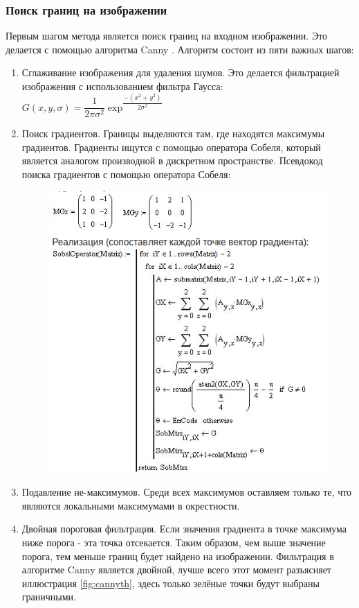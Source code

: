 \subsubsection{Поиск границ на изображении}
Первым шагом метода является поиск границ на входном изображении. Это делается с помощью алгоритма Canny \cite{b:canny}. Алгоритм состоит из пяти важных шагов:
\begin{enumerate}
	\item Сглаживание изображения для удаления шумов. Это делается фильтрацией изображения с использованием фильтра Гаусса: \newline
	$G(x, y, \sigma) = \dfrac{1}{2\pi\sigma^2}\exp^{\dfrac{-(x^2 + y^2)}{2\sigma^2}}$
	\item Поиск градиентов. Границы выделяются там, где находятся максимумы градиентов. Градиенты ищутся с помощью оператора Собеля, который является аналогом производной в дискретном пространстве. 
	Псевдокод поиска градиентов с помощью оператора Собеля:
	\begin{figure}[!h]
		\centering
		\includegraphics{pictures/sobel}
		\caption[Поиск градиентов]{}
		\label{fig:sobel}
	\end{figure}
	\item Подавление не-максимумов. Среди всех максимумов оставляем только те, что являются локальными максимумами в окрестности.
	\item Двойная пороговая фильтрация. Если значения градиента в точке максимума ниже порога - эта точка отсекается. Таким образом, чем выше значение порога, тем меньше границ будет найдено на изображении. Фильтрация в алгоритме Canny является двойной, лучше всего этот момент разъясняет иллюстрация \ref{fig:cannyth}, здесь только зелёные точки будут выбраны граничными.

\end{enumerate}

